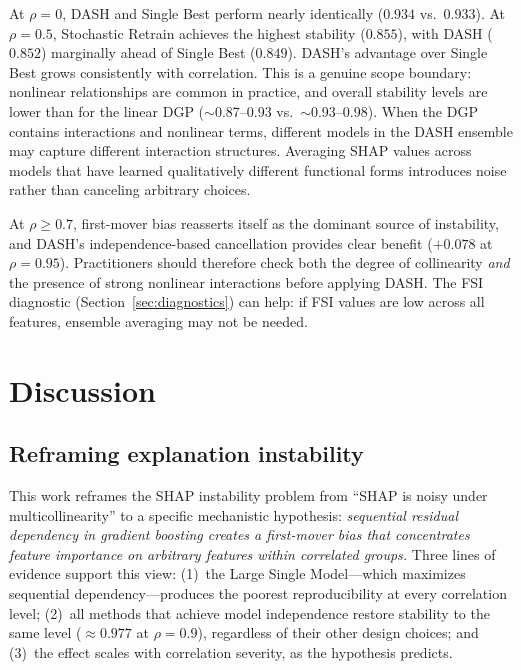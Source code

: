 \documentclass[11pt]{article}
\newcommand{\dash}{\textsc{DASH}}
\newcommand{\rhovar}{\rho}
\begin{document}
At $\rhovar = 0$, \dash{} and Single Best perform nearly identically
($0.934$ vs.\ $0.933$). At $\rhovar = 0.5$, Stochastic Retrain achieves
the highest stability ($0.855$), with \dash{} ($0.852$) marginally ahead
of Single Best ($0.849$). \dash{}'s advantage over Single Best grows
consistently with correlation. This is a genuine scope boundary: nonlinear relationships
are common in practice, and overall stability levels are lower than for
the linear DGP ($\sim$0.87--0.93 vs.\ $\sim$0.93--0.98). When the DGP
contains interactions and nonlinear terms, different models in the DASH
ensemble may capture different interaction structures. Averaging SHAP
values across models that have learned qualitatively different functional
forms introduces noise rather than canceling arbitrary choices.

At $\rhovar \geq 0.7$, first-mover bias reasserts itself as the dominant
source of instability, and \dash{}'s independence-based cancellation
provides clear benefit ($+0.078$ at $\rhovar = 0.95$).
Practitioners should therefore check both the degree of collinearity
\emph{and} the presence of strong nonlinear interactions before applying
\dash{}. The FSI diagnostic (Section~\ref{sec:diagnostics}) can help:
if FSI values are low across all features, ensemble averaging may not be
needed.


\section{Discussion}
\label{sec:discussion}

\subsection{Reframing explanation instability}

This work reframes the SHAP instability problem from ``SHAP is noisy
under multicollinearity'' to a specific mechanistic hypothesis:
\emph{sequential residual dependency in gradient boosting creates a
first-mover bias that concentrates feature importance on arbitrary
features within correlated groups.} Three lines of evidence support this view:
(1)~the Large Single Model---which maximizes sequential dependency---produces
the poorest reproducibility at every correlation level;
(2)~all methods that achieve model independence restore stability to the
same level ($\approx 0.977$ at $\rhovar = 0.9$), regardless of their other
design choices; and
(3)~the effect scales with correlation severity, as the hypothesis
predicts.
\end{document}
